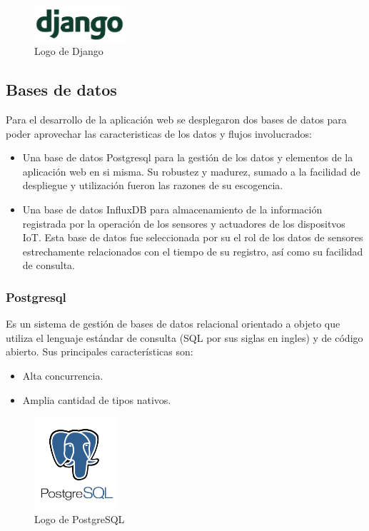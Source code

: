 \begin{figure}[ht]
\centering
\includegraphics[width=0.3\textwidth]{Figuras/django.png}
\caption{\label{fig:django-logo}Logo de Django}
\vspace*{-10pt}
\end{figure} 

\subsection{Bases de datos}
Para el desarrollo de la aplicación web se desplegaron dos bases de datos para poder aprovechar las caracteristicas de los datos y flujos involucrados:
\begin{itemize}
\item Una base de datos Postgresql para la gestión de los datos y elementos de la aplicación web en si misma. Su robustez y madurez, sumado a la facilidad de despliegue y utilización fueron las razones de su escogencia.
\item Una base de datos InfluxDB para almacenamiento de la información registrada por la operación de los sensores y actuadores de los dispositvos IoT. Esta base de datos fue seleccionada por su el rol de los datos de sensores estrechamente relacionados con el tiempo de su registro, así como su facilidad de consulta.
\end{itemize}

\subsubsection{Postgresql}
Es un sistema de gestión de bases de datos relacional orientado a objeto que utiliza el lenguaje estándar de consulta (SQL por sus siglas en ingles) y de código abierto. Sus principales características son:
\begin{itemize}
\item Alta concurrencia.
\item Amplia cantidad de tipos nativos.
\end{itemize}

\begin{figure}[ht]
\vspace*{-15pt}
\centering
\includegraphics[width=0.275\textwidth]{Figuras/postgresql_logo.png}
\caption{\label{fig:postgresql-logo}Logo de PostgreSQL}
\vspace*{-15pt}
\end{figure}

